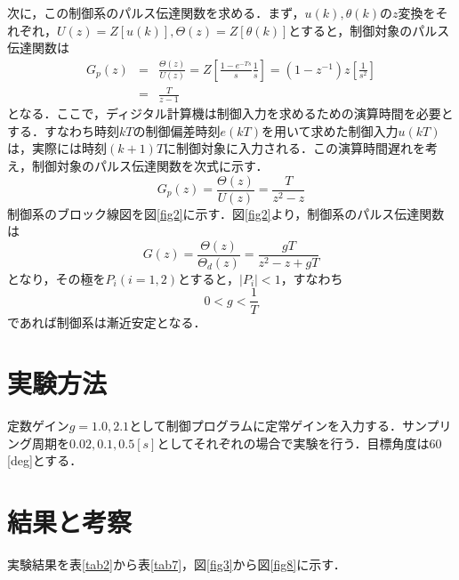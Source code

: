 \documentclass[11pt,a4paper]{jsarticle}
\begin{document}
次に，この制御系のパルス伝達関数を求める．まず，$u(k),\theta (k)$の$z$変換をそれぞれ，$U(z) = Z[u(k)],\Theta (z) = Z[\theta (k)]$とすると，制御対象のパルス伝達関数は
\begin{eqnarray}
 G_p (z) & = & \frac{\Theta(z)}{U(z)} = Z[\frac{1-e^{-Ts}}{s} \frac{1}{s}] = (1-z^{-1})z[\frac{1}{s^2}] \nonumber \\ 
& = & \frac{T}{z-1}
\end{eqnarray}
となる．ここで，ディジタル計算機は制御入力を求めるための演算時間を必要とする．すなわち時刻$kT$の制御偏差時刻$e(kT)$を用いて求めた制御入力$u(kT)$は，実際には時刻$(k+1)T$に制御対象に入力される．この演算時間遅れを考え，制御対象のパルス伝達関数を次式に示す．
\begin{equation}
 G_p (z) = \frac{\Theta(z)}{U(z)} = \frac{T}{z^2-z}
\end{equation}
制御系のブロック線図を図\ref{fig2}に示す．図\ref{fig2}より，制御系のパルス伝達関数は
\begin{equation}
 G(z) = \frac{\Theta(z)}{\Theta_d (z)} = \frac{gT}{z^2-z+gT}
\label{eq4}
\end{equation}
となり，その極を$P_i (i = 1,2)$とすると，$|P_i| < 1$，すなわち
\begin{equation}
 0 < g < \frac{1}{T}
\label{eq5}
\end{equation}
であれば制御系は漸近安定となる．

\section{実験方法}
定数ゲイン$g = 1.0,2.1$として制御プログラムに定常ゲインを入力する．サンプリング周期を$0.02,0.1,0.5[s]$としてそれぞれの場合で実験を行う．目標角度は$60$[deg]とする．

\section{結果と考察}
実験結果を表\ref{tab2}から表\ref{tab7}，図\ref{fig3}から図\ref{fig8}に示す．







\end{document}
